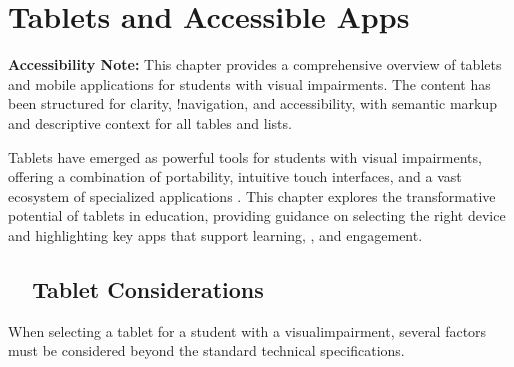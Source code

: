 \chapter{Tablets and Accessible Apps}\label{ch2:tablets}

\begin{raggedright}
	\textbf{Accessibility Note:} This chapter provides a comprehensive overview of tablets and mobile applications for students with visual impairments. The content has been structured for clarity, !navigation, and accessibility, with semantic markup and descriptive context for all tables and lists.
\end{raggedright}

Tablets have emerged as powerful tools for students with visual impairments, offering a combination of portability, intuitive touch interfaces, and a vast ecosystem of specialized applications \supercite{Day2021, Kelly2011}. This chapter explores the transformative potential of tablets in education, providing guidance on selecting the right device and highlighting key apps that support learning, , and engagement.

\section{~~Tablet Considerations}\label{ch2:sec:tablet-considerations}

When selecting a \gls{tablet} for a student with a \gls{visualimpairment}, several factors must be considered beyond the standard technical specifications.

